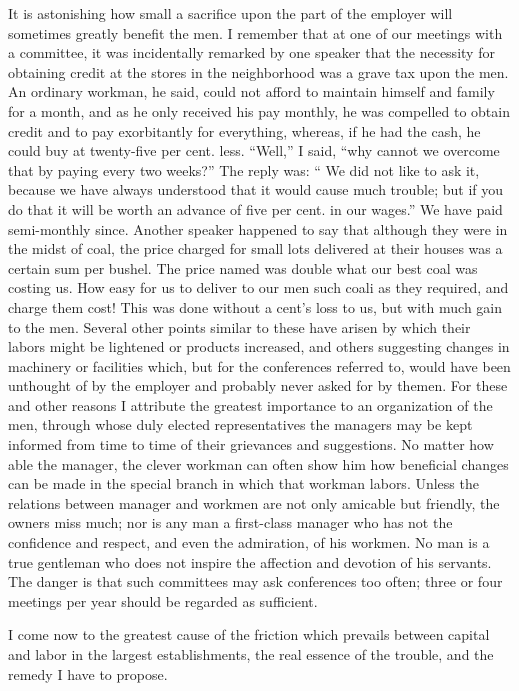 \documentclass[11pt,openany]{book}
\begin{document}
It is astonishing how small a sacrifice upon the part of the employer will sometimes greatly benefit the men. I remember that at one of our meetings with a committee, it was incidentally remarked by one speaker that the necessity for obtaining credit at the stores in the neighborhood was a grave tax upon the men. An ordinary workman, he said, could not afford to maintain himself and family for a month, and as he only received his pay monthly, he was compelled to obtain credit and to pay exorbitantly for everything, whereas, if he had the cash, he could buy at twenty-five per cent. less. ``Well,'' I said, ``why cannot we overcome that by paying every two weeks?'' The reply was: `` We did not like to ask it, because we have always understood that it would cause much trouble; but if you do that it will be worth an advance of five per cent. in our wages.'' We have paid semi-monthly since. Another speaker happened to say that although they were in the midst of coal, the price charged for small lots delivered at their houses was a certain sum per bushel. The price named was double what our best coal was costing us. How easy for us to deliver to our men such coali as they required, and charge them cost! This was done without a cent's loss to us, but with much gain to the men. Several other points similar to these have arisen by which their labors might be lightened or products increased, and others suggesting changes in machinery or facilities which, but for the conferences referred to, would have been unthought of by the employer and probably never asked for by themen. For these and other reasons I attribute the greatest importance to an organization of the men, through whose duly elected representatives the managers may be kept informed from time to time of their grievances and suggestions. No matter how able the manager, the clever workman can often show him how beneficial changes can be made in the special branch in which that workman labors. Unless the relations between manager and workmen are not only amicable but friendly, the owners miss much; nor is any man a first-class manager who has not the confidence and respect, and even the admiration, of his workmen. No man is a true gentleman who does not inspire the affection and devotion of his servants. The danger is that such committees may ask conferences too often; three or four meetings per year should be regarded as sufficient.

I come now to the greatest cause of the friction which prevails between capital and labor in the largest establishments, the real essence of the trouble, and the remedy I have to propose.
\end{document}
